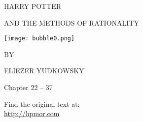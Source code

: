 



\begin{center}
\thispagestyle{empty}
{\hp
\Huge\MakeUppercase{Harry Potter}\vspace*{0.5cm}

\Large\MakeUppercase{and the Methods of Rationality} %
 
\texttt{[image: bubble0.png]} 

\Large BY \vspace*{.25cm}

\huge ELIEZER YUDKOWSKY%

\normalsize

\vspace*{1\baselineskip}
}

Chapter 22 -- 37

\vspace{3cm}
Find the original text at:\\
\url{http://hpmor.com} \\

\end{center}

